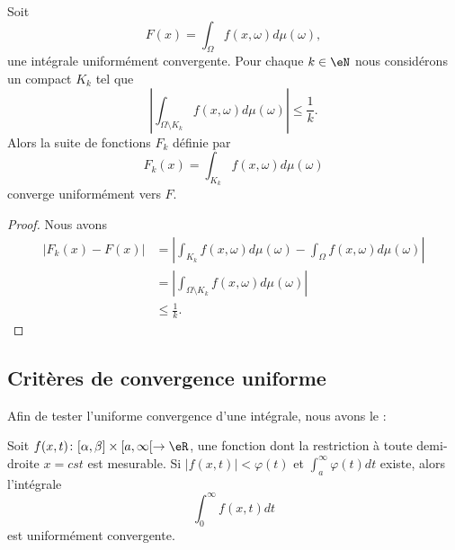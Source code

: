 \begin{lemma}       \label{LemOgQdpJ}
    Soit
    \begin{equation}
        F(x)=\int_{\Omega}f(x,\omega)d\mu(\omega),
    \end{equation}
    une intégrale uniformément convergente. Pour chaque \( k\in \eN\) nous considérons un compact \( K_k\) tel que
    \begin{equation}
        \left| \int_{\Omega\setminus K_k}f(x,\omega)d\mu(\omega) \right| \leq\frac{1}{ k }.
    \end{equation}
    Alors la suite de fonctions \( F_k\) définie par
    \begin{equation}
        F_k(x)=\int_{K_k}f(x,\omega)d\mu(\omega)
    \end{equation}
    converge uniformément vers \( F\).
\end{lemma}

\begin{proof}
    Nous avons
    \begin{subequations}
        \begin{align}
            \big| F_k(x)-F(x) \big|&=\left| \int_{K_k}f(x,\omega)d\mu(\omega)-\int_{\Omega}f(x,\omega)d\mu(\omega) \right| \\
            &=| \int_{\Omega\setminus K_k}f(x,\omega)d\mu(\omega) |\\
            &\leq \frac{1}{ k }.
        \end{align}
    \end{subequations}
\end{proof}

\subsection{Critères de convergence uniforme}

Afin de tester l'uniforme convergence d'une intégrale, nous avons le :
\begin{theorem}		\label{ThoCritWeiIntUnifCv}
Soit $f(x,t)\colon [\alpha,\beta]\times[a,\infty[ \to \eR$, une fonction dont la restriction à toute demi-droite $x=cst$ est mesurable. Si $| f(x,t) |< \varphi(t)$ et $\int_a^{\infty}\varphi(t)dt$ existe, alors l'intégrale
\begin{equation}
	\int_0^{\infty}f(x,t)dt
\end{equation}
est uniformément convergente.
\end{theorem}

